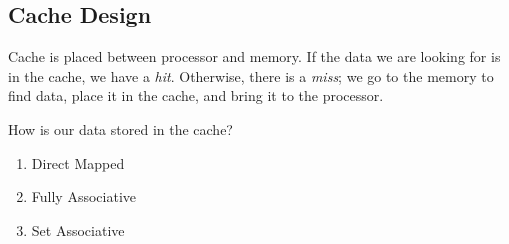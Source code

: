 \subsection{Cache Design}
Cache is placed between processor and memory. If the data we are looking for is in the cache, we have a \emph{hit}. Otherwise, there is a \emph{miss}; we go to the memory to find data, place it in the cache, and bring it to the processor.

How is our data stored in the cache?
\begin{enumerate}
    \item Direct Mapped
    \item Fully Associative
    \item Set Associative
\end{enumerate}